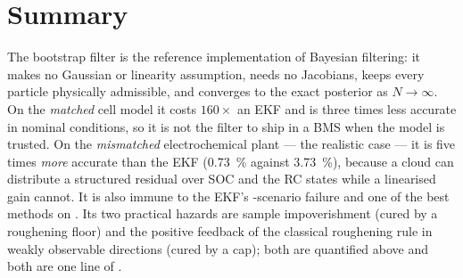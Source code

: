 \section{Summary}
The bootstrap filter is the reference implementation of Bayesian filtering: it makes no Gaussian or
linearity assumption, needs no Jacobians, keeps every particle physically admissible, and converges
to the exact posterior as $N\to\infty$.  On the \emph{matched} cell model it costs $160\times$ an
EKF and is three times less accurate in nominal conditions, so it is not the filter to ship in a
BMS when the model is trusted.  On the \emph{mismatched} electrochemical plant --- the realistic
case --- it is five times \emph{more} accurate than the EKF (\SI{0.73}{\percent} against
\SI{3.73}{\percent}), because a cloud can distribute a structured residual over SOC and the RC
states while a linearised gain cannot.  It is also immune to the EKF's -scenario
failure and one of the best methods on .  Its two practical hazards are
sample impoverishment (cured by a roughening floor) and the positive feedback of the classical
roughening rule in weakly observable directions (cured by a cap); both are quantified above and
both are one line of .
